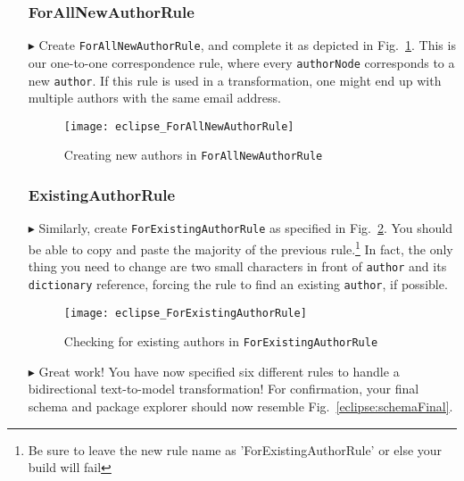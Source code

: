 \begin{itemize}
\subsubsection{ForAllNewAuthorRule} %

\item[$\blacktriangleright$] Create \texttt{ForAllNewAuthorRule}, and complete it as depicted in Fig.~\ref{eclipse:ForAllNewAuthorRule}. This is our one-to-one
correspondence rule, where every \texttt{authorNode} corresponds to a new \texttt{author}. If this rule is used in a transformation, one might end up with
multiple authors with the same email address.

\begin{figure}[htbp]
\begin{center}
  \texttt{[image: eclipse\_ForAllNewAuthorRule]}
  \caption{Creating new authors in \texttt{ForAllNewAuthorRule}}
  \label{eclipse:ForAllNewAuthorRule}
\end{center}
\end{figure}

\subsubsection{ExistingAuthorRule} %

\item[$\blacktriangleright$] Similarly, create \texttt{ForExistingAuthorRule} as specified in Fig.~\ref{eclipse:ForExistingAuthorRule}. You should be able to
copy and paste the majority of the previous rule.\footnote{Be sure to leave the new rule name as 'ForExistingAuthorRule' or else your build will fail} In fact,
the only thing you need to change are two small characters in front of \texttt{author} and its \texttt{dictionary} reference, forcing the rule to find an existing \texttt{author}, if possible.

\begin{figure}[htbp]
\begin{center}
  \texttt{[image: eclipse\_ForExistingAuthorRule]}
  \caption{Checking for existing authors in \texttt{ForExistingAuthorRule}}
  \label{eclipse:ForExistingAuthorRule}
\end{center}
\end{figure}

\newpage

\item[$\blacktriangleright$] Great work! You have now specified six different rules to handle a bidirectional text-to-model transformation! For confirmation,
your final schema and package explorer should now resemble Fig.~\ref{eclipse:schemaFinal}.


\end{itemize}
